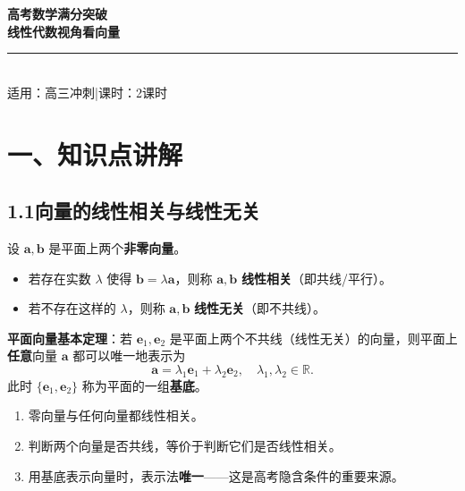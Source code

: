 \documentclass[12pt, a4paper]{ctexart}
\begin{document}
\begin{center}
{\Huge\bfseries\textcolor{mainblue}{高考数学满分突破}}\\[6pt]
{\LARGE\bfseries\textcolor{mainblue}{线性代数视角看向量}}\\[12pt]
\rule{0.6\textwidth}{1pt}\\[8pt]
{\normalsize 适用：高三冲刺\quad |\quad 课时：2课时}
\end{center}
\vspace{10pt}

\section*{\textcolor{mainblue}{一、知识点讲解}}

\subsection*{1.1\quad 向量的线性相关与线性无关}

\begin{knowledgebox}[核心概念]
设 $\boldsymbol{a},\boldsymbol{b}$ 是平面上两个\textbf{非零向量}。
\begin{itemize}[leftmargin=2em]
  \item 若存在实数 $\lambda$ 使得 $\boldsymbol{b}=\lambda\boldsymbol{a}$，则称 $\boldsymbol{a},\boldsymbol{b}$ \textbf{线性相关}（即共线/平行）。
  \item 若不存在这样的 $\lambda$，则称 $\boldsymbol{a},\boldsymbol{b}$ \textbf{线性无关}（即不共线）。
\end{itemize}
\end{knowledgebox}

\noindent\textbf{平面向量基本定理}：若 $\boldsymbol{e}_1,\boldsymbol{e}_2$ 是平面上两个不共线（线性无关）的向量，则平面上\textbf{任意}向量 $\boldsymbol{a}$ 都可以唯一地表示为
\[
  \boldsymbol{a}=\lambda_1\boldsymbol{e}_1+\lambda_2\boldsymbol{e}_2,\quad \lambda_1,\lambda_2\in\mathbb{R}.
\]
此时 $\{\boldsymbol{e}_1,\boldsymbol{e}_2\}$ 称为平面的一组\textbf{基底}。

\begin{warnbox}[易错提醒]
\begin{enumerate}[leftmargin=1.5em]
  \item 零向量与任何向量都线性相关。
  \item 判断两个向量是否共线，等价于判断它们是否线性相关。
  \item 用基底表示向量时，表示法\textbf{唯一}——这是高考隐含条件的重要来源。
\end{enumerate}
\end{warnbox}
\end{document}

